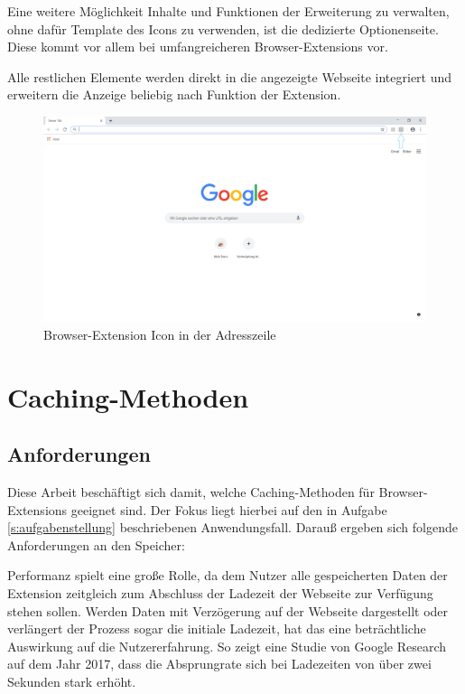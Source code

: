 Eine weitere Möglichkeit Inhalte und Funktionen der Erweiterung zu verwalten, ohne dafür Template des Icons zu verwenden, ist die dedizierte Optionenseite\cite{options}. Diese kommt vor allem bei umfangreicheren Browser-Extensions vor.

Alle restlichen Elemente werden direkt in die angezeigte Webseite integriert und erweitern die Anzeige beliebig nach Funktion der Extension.

\begin{figure}[ht]
	\centering
	\includegraphics[width=1\textwidth]{pics/browser1.png}
	\caption{Browser-Extension Icon in der Adresszeile}
	\label{browser1}
\end{figure}

\section{Caching-Methoden}
\label{s:cachingmethoden}

\subsection{Anforderungen}
\label{ss:cacheanforderungen}

Diese Arbeit beschäftigt sich damit, welche Caching-Methoden für Browser- Extensions geeignet sind. Der Fokus liegt hierbei auf den in Aufgabe \ref{s:aufgabenstellung} beschriebenen Anwendungsfall. Darauß ergeben sich folgende Anforderungen an den Speicher:

Performanz spielt eine große Rolle, da dem Nutzer alle gespeicherten Daten der Extension zeitgleich zum Abschluss der Ladezeit der Webseite zur Verfügung stehen sollen. Werden Daten mit Verzögerung auf der Webseite dargestellt oder verlängert der Prozess sogar die initiale Ladezeit, hat das eine beträchtliche Auswirkung auf die Nutzererfahrung. So zeigt eine Studie von Google Research auf dem Jahr 2017\cite{benchmark}, dass die Absprungrate sich bei Ladezeiten von über zwei Sekunden stark erhöht.


